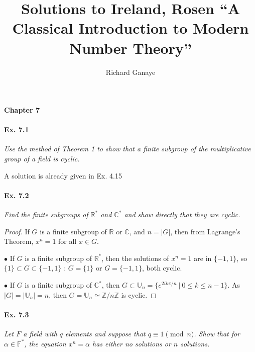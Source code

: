 \documentclass[11pt,a4paper]{article}
\title{Solutions to Ireland, Rosen ``A Classical Introduction to Modern Number Theory''}
\author{Richard Ganaye}
\newcommand{\Z}{\mathbb{Z}}
\newcommand{\R}{\mathbb{R}}
\newcommand{\C}{\mathbb{C}}
\newcommand{\F}{\mathbb{F}}
\begin{document}
\maketitle

{\large \bf Chapter 7}

\paragraph{Ex. 7.1}

{\it Use the method of Theorem 1 to show that a finite subgroup of the
multiplicative group of a field is cyclic.
}

\bigskip

A solution is already given in Ex. 4.15

\paragraph{Ex. 7.2}

{\it Find the finite subgroups of $\R^*$ and $\C^*$ and show directly that they are cyclic.
}

\begin{proof}
If $G$ is a finite subgroup of $\R$ or $\C$, and $n = \vert G \vert$, then from Lagrange's Theorem, $x^n = 1$ for all $x \in G$.

$\bullet$ If  $G$ is a finite subgroup of $\R^*$, then the solutions of $x^n=1$ are in $\{-1,1\}$, so $\{1\} \subset G\subset \{-1,1\}$ : 
$G = \{1\}$ or $G = \{-1,1\}$, both cyclic.

$\bullet$ If  $G$ is a finite subgroup of $\C^*$, then $G \subset \mathbb{U}_n = \{e^{2ik\pi/n}\ \vert \ 0 \leq k \leq n-1\}$. As $\vert G \vert = \vert \mathbb{U}_n \vert = n$, then  $G = \mathbb{U}_n \simeq \Z/n\Z$ is cyclic.
\end{proof}

\paragraph{Ex. 7.3}

{\it  Let $F$ a field with $q$ elements and suppose that $q\equiv 1 \pmod n$. Show that for $\alpha \in \F^*$, the equation $x^n = \alpha$ has either no solutions or $n$ solutions.
}
\end{document}
